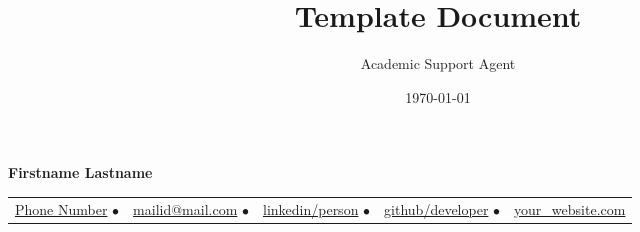 \documentclass{article}
\title{Template Document}
\author{Academic Support Agent}
\date{\today}
\begin{document}
\maketitle

    \fontsize{9}{15}
    \selectfont
    \begin{center}
        \begin{center}
            \Huge\bfseries Firstname Lastname
        \end{center}
            \begin{tabular}{c c c c c}
                \href{tel:Phone-Number}{Phone Number} $\bullet$ & 
                \href{mailto:mailid@mail.com}{mailid@mail.com} $\bullet$ & 
                \href{https://www.linkedin.com/in/person/}{linkedin/person} $\bullet$ & 
                \href{https://github.com/developer/}{github/developer} $\bullet$ &  
                \href{https://yourwebsite.com/}{your\_website.com} \\
        \end{tabular}
    \end{center}    
    \vspace{-0.75em}
    
    
    
    
    
\end{document}

